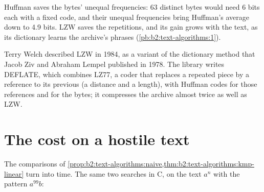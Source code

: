 \label{out:b2:text-algorithms:ratio}

Huffman saves the bytes' unequal frequencies: 63 distinct bytes would need 6 bits each with a fixed code, and their
unequal frequencies bring Huffman's average down to 4.9 bits. LZW saves the repetitions, and
its gain grows with the text, as its dictionary learns the archive's phrases (\cref{pb:b2:text-algorithms:1}).

\begin{inpractice}
Terry Welch described LZW in 1984, as a variant of the dictionary method that Jacob Ziv and Abraham Lempel published
in 1978. The  library writes DEFLATE, which combines LZ77, a coder that
replaces a repeated piece by a reference to its previous  (a distance and a length), with Huffman codes for
those references and for the bytes; it compresses the archive almost twice as well as LZW.
\end{inpractice}

\section{The cost on a hostile text}\label{sec:b2:text-algorithms:hostile}

The comparisons of \cref{prop:b2:text-algorithms:naive,thm:b2:text-algorithms:kmp-linear} turn into time. The same two
searches in C, on the text $a^n$ with the pattern $a^{99}b$:

\label{out:b2:text-algorithms:bench}

